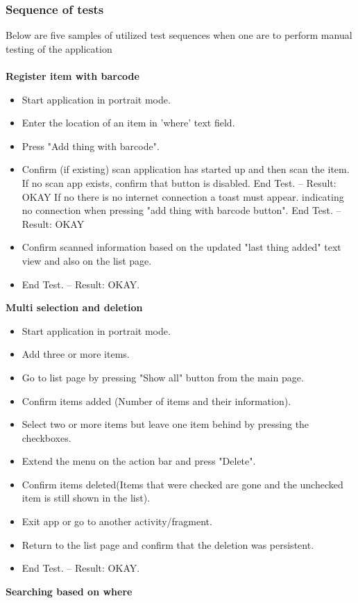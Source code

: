 \documentclass{article}
\begin{document}
\subsubsection{Sequence of tests}
Below are five samples of utilized test sequences when one are to perform manual testing of the application
\\\\\textbf{Register item with barcode}
\begin{itemize}
	\item Start application in portrait mode.
	\item Enter the location of an item in 'where' text field.
	\item Press "Add thing with barcode".
	\item Confirm (if existing) scan application has started up and then scan the item.
	\subitem If no scan app exists, confirm that button is disabled. End Test. -- Result: OKAY
	\subitem If no there is no internet connection a toast must appear. indicating no connection when pressing "add thing with barcode button". End Test. -- Result: OKAY
	\item Confirm scanned information based on the updated "last thing added" text view and also on the list page.
	\item End Test. -- Result: OKAY.
\end{itemize}\textbf{Multi selection and deletion}
\begin{itemize}
	\item Start application in portrait mode.
	\item Add three or more items.
	\item Go to list page by pressing "Show all" button from the main page.
	\item Confirm items added (Number of items and their information).
	\item Select two or more items but leave one item behind by pressing the checkboxes.
	\item Extend the menu on the action bar and press "Delete".
	\item Confirm items deleted(Items that were checked are gone and the unchecked item is still shown in the list).
	\item Exit app or go to another activity/fragment.
	\item Return to the list page and confirm that the deletion was persistent.
	\item End Test.  -- Result: OKAY.
\end{itemize}\textbf{Searching based on where}
\end{document}
